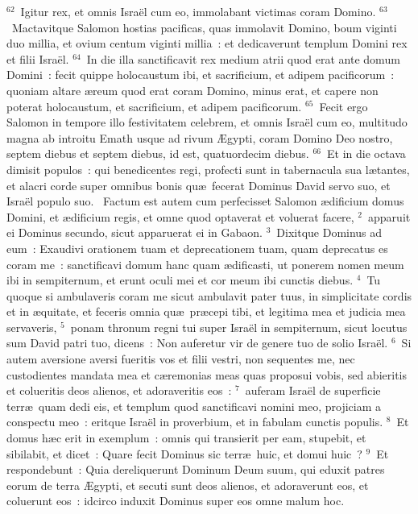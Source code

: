 ${}^{62}$~Igitur rex, et omnis Isra\"el cum eo, immolabant victimas coram Domino.
${}^{63}$~Mactavitque Salomon hostias pacificas, quas immolavit Domino, boum viginti duo millia, et ovium centum viginti millia~: et dedicaverunt templum Domini rex et filii Isra\"el.
${}^{64}$~In die illa sanctificavit rex medium atrii quod erat ante domum Domini~: fecit quippe holocaustum ibi, et sacrificium, et adipem pacificorum~: quoniam altare \ae reum quod erat coram Domino, minus erat, et capere non poterat holocaustum, et sacrificium, et adipem pacificorum.
${}^{65}$~Fecit ergo Salomon in tempore illo festivitatem celebrem, et omnis Isra\"el cum eo, multitudo magna ab introitu Emath usque ad rivum \AE gypti, coram Domino Deo nostro, septem diebus et septem diebus, id est, quatuordecim diebus.
${}^{66}$~Et in die octava dimisit populos~: qui benedicentes regi, profecti sunt in tabernacula sua l\ae tantes, et alacri corde super omnibus bonis qu\ae\ fecerat Dominus David servo suo, et Isra\"el populo suo.
~Factum est autem cum perfecisset Salomon \ae dificium domus Domini, et \ae dificium regis, et omne quod optaverat et voluerat facere,
${}^{2}$~apparuit ei Dominus secundo, sicut apparuerat ei in Gabaon.
${}^{3}$~Dixitque Dominus ad eum~: Exaudivi orationem tuam et deprecationem tuam, quam deprecatus es coram me~: sanctificavi domum hanc quam \ae dificasti, ut ponerem nomen meum ibi in sempiternum, et erunt oculi mei et cor meum ibi cunctis diebus.
${}^{4}$~Tu quoque si ambulaveris coram me sicut ambulavit pater tuus, in simplicitate cordis et in \ae quitate, et feceris omnia qu\ae\ pr\ae cepi tibi, et legitima mea et judicia mea servaveris,
${}^{5}$~ponam thronum regni tui super Isra\"el in sempiternum, sicut locutus sum David patri tuo, dicens~: Non auferetur vir de genere tuo de solio Isra\"el.
${}^{6}$~Si autem aversione aversi fueritis vos et filii vestri, non sequentes me, nec custodientes mandata mea et c\ae remonias meas quas proposui vobis, sed abieritis et colueritis deos alienos, et adoraveritis eos~:
${}^{7}$~auferam Isra\"el de superficie terr\ae\ quam dedi eis, et templum quod sanctificavi nomini meo, projiciam a conspectu meo~: eritque Isra\"el in proverbium, et in fabulam cunctis populis.
${}^{8}$~Et domus h\ae c erit in exemplum~: omnis qui transierit per eam, stupebit, et sibilabit, et dicet~: Quare fecit Dominus sic terr\ae\ huic, et domui huic~?
${}^{9}$~Et respondebunt~: Quia dereliquerunt Dominum Deum suum, qui eduxit patres eorum de terra \AE gypti, et secuti sunt deos alienos, et adoraverunt eos, et coluerunt eos~: idcirco induxit Dominus super eos omne malum hoc.


